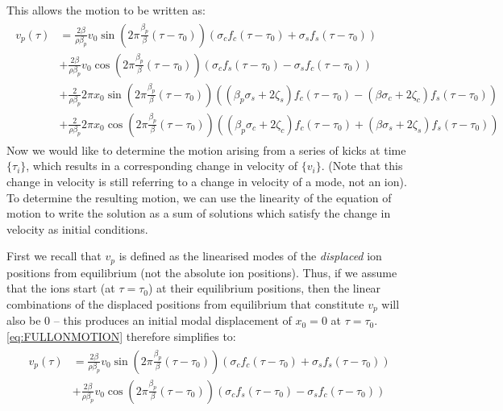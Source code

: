 \documentclass{article}
\begin{document}
\noindent This allows the motion to be written as:
\begin{align}
\begin{split}
v_p (\tau) & = \frac{2 \beta}{\rho \beta_p} v_0 \sin \left( 2 \pi \frac{\beta_p}{\beta} (\tau - \tau_0) \right) (\sigma_c f_c (\tau - \tau_0) + \sigma_s f_s (\tau - \tau_0)) \\
&+ \frac{2 \beta}{\rho \beta_p} v_0 \cos \left( 2 \pi \frac{\beta_p}{\beta} (\tau - \tau_0) \right) (\sigma_c f_s (\tau - \tau_0) - \sigma_s f_c (\tau - \tau_0)) \\
&+ \frac{2}{\rho \beta_p} 2 \pi x_0 \sin \left( 2 \pi \frac{\beta_p}{\beta} (\tau - \tau_0) \right) ((\beta_p \sigma_s + 2 \zeta_s) f_c (\tau - \tau_0) - (\beta \sigma_c + 2 \zeta_c) f_s (\tau - \tau_0)) \\
&+ \frac{2}{\rho \beta_p} 2 \pi x_0 \cos \left( 2 \pi \frac{\beta_p}{\beta} (\tau - \tau_0) \right) ((\beta_p \sigma_c + 2 \zeta_c) f_c (\tau - \tau_0) + (\beta \sigma_s + 2 \zeta_s) f_s (\tau - \tau_0)) 
\end{split} \label{eq:FULLONMOTION}
\end{align}
Now we would like to determine the motion arising from a series of kicks at time $\{ \tau_i \}$, which results in a corresponding change in velocity of $\{ v_i \}$. (Note that this change in velocity is still referring to a change in velocity of a mode, not an ion). To determine the resulting motion, we can use the linearity of the equation of motion to write the solution as a sum of solutions which satisfy the change in velocity as initial conditions. \par
\medskip
\noindent First we recall that $v_p$ is defined as the linearised modes of the \textit{displaced} ion positions from equilibrium (not the absolute ion positions). Thus, if we assume that the ions start (at $\tau = \tau_0$) at their equilibrium positions, then the linear combinations of the displaced positions from equilibrium that constitute $v_p$ will also be 0 -- this produces an initial modal displacement of $x_0 = 0$ at $\tau = \tau_0$. \eqref{eq:FULLONMOTION} therefore simplifies to: 
\begin{align}
	\begin{split}
v_p (\tau) & = \frac{2 \beta}{\rho \beta_p} v_0 \sin \left( 2 \pi \frac{\beta_p}{\beta} (\tau - \tau_0) \right) (\sigma_c f_c (\tau - \tau_0) + \sigma_s f_s (\tau - \tau_0)) \\
&+ \frac{2 \beta}{\rho \beta_p} v_0 \cos \left( 2 \pi \frac{\beta_p}{\beta} (\tau - \tau_0) \right) (\sigma_c f_s (\tau - \tau_0) - \sigma_s f_c (\tau - \tau_0))
\end{split} \label{eq:phoebe}
\end{align}
\end{document}
